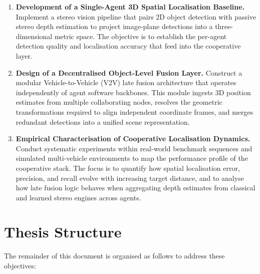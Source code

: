 \begin{enumerate}[label=\textbf{O\arabic*.},leftmargin=*,itemsep=4pt]
  \item \textbf{Development of a Single-Agent 3D Spatial Localisation Baseline.}
  Implement a stereo vision pipeline that pairs 2D object detection with passive
  stereo depth estimation to project image-plane detections into a
  three-dimensional metric space. The objective is to establish the per-agent
  detection quality and localisation accuracy that feed into the cooperative
  layer.

  \item \textbf{Design of a Decentralised Object-Level Fusion Layer.} Construct a
  modular Vehicle-to-Vehicle (V2V) late fusion architecture that operates
  independently of agent software backbones. This module ingests 3D position
  estimates from multiple collaborating nodes, resolves the geometric
  transformations required to align independent coordinate frames, and merges
  redundant detections into a unified scene representation.

  \item \textbf{Empirical Characterisation of Cooperative Localisation
  Dynamics.} Conduct systematic experiments within real-world benchmark
  sequences and simulated multi-vehicle environments to map the performance
  profile of the cooperative stack. The focus is to quantify how spatial
  localisation error, precision, and recall evolve with increasing target
  distance, and to analyse how late fusion logic behaves when aggregating depth
  estimates from classical and learned stereo engines across agents.
\end{enumerate}

\section{Thesis Structure}

The remainder of this document is organised as follows to address these
objectives:

